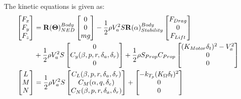 The kinetic equations is given as:
\begin{subequations}
\label{eq:kinetics}
\begin{align}
\begin{bmatrix}
F_x \\
F_y \\
F_z
\end{bmatrix}
&= \mathbf{R}(\mathbf{\Theta})^{Body}_{NED}\begin{bmatrix}
0 \\
0 \\
mg
\end{bmatrix} - \frac{1}{2} \rho V_a^2 S \mathbf{R}(\alpha)_{Stability}^{Body}\begin{bmatrix}
F_{Drag} \\
0 \\
F_{Lift}
\end{bmatrix}\\ &+ \frac{1}{2} \rho V_a^2 S \begin{bmatrix}
0 \\
C_y(\beta,p,r,\delta_a,\delta_r) \notag\\
0
\end{bmatrix} + \frac{1}{2} \rho S_{Prop} C_{Prop} \begin{bmatrix}
(K_{Motor}\delta_t)^2-V_a^2 \\
0 \\
0
\end{bmatrix}\\
\begin{bmatrix}
 L \\
 M \\
 N 
 \end{bmatrix} &= \frac{1}{2} \rho V_a^2S\begin{bmatrix}
 C_L(\beta,p,r,\delta_a,\delta_r) \\
 C_M(\alpha,q,\delta_e) \\
 C_N(\beta,p,r,\delta_a,\delta_r)
 \end{bmatrix} + \begin{bmatrix}
 -k_{T_p}(K_\Omega\delta_t)^2 \\
 0 \\
 0
 \end{bmatrix}
\end{align}
\end{subequations}
